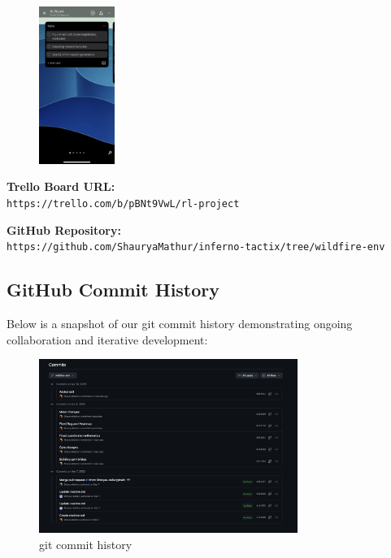 \documentclass[conference]{IEEEtran}
\begin{document}
\vspace{-0.7cm}
\begin{figure}[H]
\centering
\includegraphics[width=0.22\textwidth]{5.jpg}
\end{figure}

\vspace{-0.3cm}
\noindent\textbf{Trello Board URL:} \\
\texttt{https://trello.com/b/pBNt9VwL/rl-project}

\vspace{0.3cm}
\noindent\textbf{GitHub Repository:} \\
\texttt{https://github.com/ShauryaMathur/inferno-tactix/tree/wildfire-env}

\subsection{GitHub Commit History}
\hspace{-0.4cm}Below is a snapshot of our git commit history demonstrating ongoing collaboration and iterative development:

\begin{figure}[H]
\centering
\includegraphics[width=0.75\textwidth]{6.png}
\caption{git commit history}
\end{figure}
\end{document}
